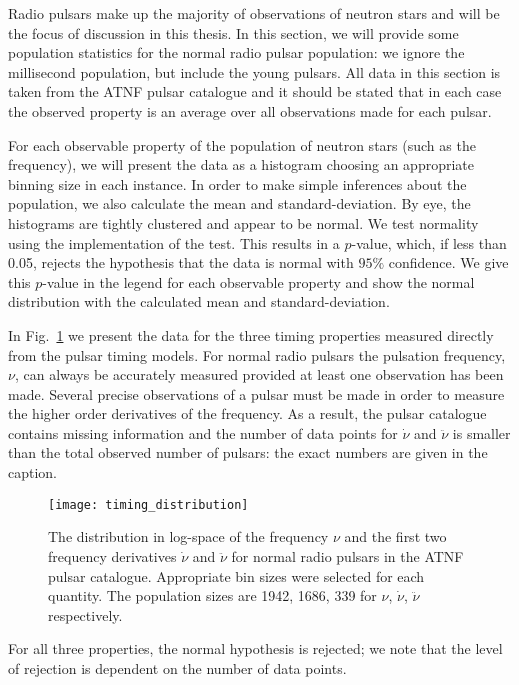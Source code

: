 Radio pulsars make up the majority of observations of neutron stars and will be
the focus of discussion in this thesis. In this section, we will provide some
population statistics for the normal radio pulsar population: we ignore the
millisecond population, but include the young pulsars. All data
in this section is taken from the ATNF pulsar catalogue \citet{ATNF} and it
should be stated that in each case the observed property is an average
over all observations made for each pulsar.

For each observable property of the population of neutron stars (such as the
frequency), we will present the data as a histogram choosing an appropriate
binning size in each instance. In order to make simple inferences about the
population, we also calculate the mean and standard-deviation. By eye, the
histograms are tightly clustered and appear to be normal. We test normality
using the \citet{Scipy} implementation of the \citet{d1971omnibus} test. This
results in a $p$-value, which, if less than 0.05, rejects the hypothesis that
the data is normal with $95\%$ confidence. We give this $p$-value in the legend
for each observable property and show the normal distribution with the calculated
mean and standard-deviation.

In Fig.~\ref{fig: pop stats timing} we present the data for the three timing
properties measured directly from the pulsar timing models. For normal radio
pulsars the pulsation frequency, $\nu$, can always be accurately measured
provided at least
one observation has been made.  Several precise observations of a pulsar must
be made in order to measure the higher order derivatives of the frequency. As a
result, the pulsar catalogue contains missing information and the number of
data points for $\dot{\nu}$ and $\ddot{\nu}$ is smaller than the total observed
number of pulsars: the exact numbers are given in the caption.
\begin{figure}[htb]
\centering
\texttt{[image: timing\_distribution]}
\caption{The distribution in log-space of the frequency $\nu$ and the first two
frequency derivatives $\dot{\nu}$ and $\ddot{\nu}$ for normal radio pulsars in the
ATNF pulsar catalogue. Appropriate bin sizes were selected for each quantity.
The population sizes are 1942, 1686, 339 for $\nu$,
$\dot{\nu}$, $\ddot{\nu}$ respectively.}
\label{fig: pop stats timing}
\end{figure}
For all three properties, the normal hypothesis is rejected; we note that the
level of rejection is dependent on the number of data points.

